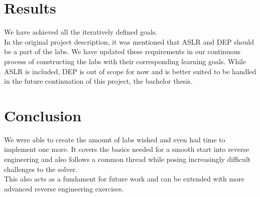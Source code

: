 \section{Results}
We have achieved all the iteratively defined goals. \\
In the original project description, it was mentioned that ASLR and DEP should be a part of the labs. We have updated these requirements in our continuous process of constructing the labs with their corresponding learning goals. While ASLR is included, DEP is out of scope for now and is better suited to be handled in the future continuation of this project, the bachelor thesis.

\section{Conclusion}
We were able to create the amount of labs wished and even had time to implement one more. It covers the basics needed for a smooth start into reverse engineering and also follows a common thread while posing increasingly difficult challenges to the solver. \\
This also acts as a fundament for future work and can be extended with more advanced reverse engineering exercises. 
